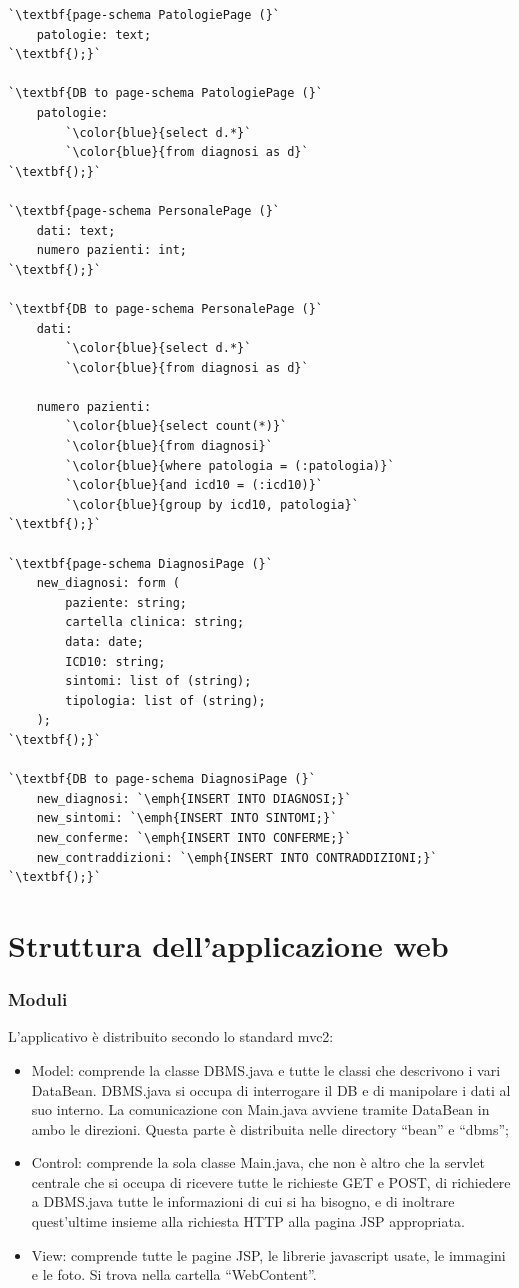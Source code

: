 \documentclass[a4paper,titlepage]{article}
\begin{document}
\newpage
\begin{lstlisting}
`\textbf{page-schema PatologiePage (}`
	patologie: text;
`\textbf{);}`

`\textbf{DB to page-schema PatologiePage (}`
	patologie: 	
		`\color{blue}{select d.*}`
		`\color{blue}{from diagnosi as d}`
`\textbf{);}`

`\textbf{page-schema PersonalePage (}`
	dati: text;
	numero pazienti: int;
`\textbf{);}`

`\textbf{DB to page-schema PersonalePage (}`
	dati: 	
		`\color{blue}{select d.*}`
		`\color{blue}{from diagnosi as d}`

	numero pazienti:
		`\color{blue}{select count(*)}`
		`\color{blue}{from diagnosi}`
		`\color{blue}{where patologia = (:patologia)}` 
		`\color{blue}{and icd10 = (:icd10)}`
		`\color{blue}{group by icd10, patologia}`
`\textbf{);}`

`\textbf{page-schema DiagnosiPage (}`
	new_diagnosi: form (
		paziente: string;
		cartella clinica: string;
		data: date;
		ICD10: string;
		sintomi: list of (string);
		tipologia: list of (string);
	);
`\textbf{);}`

`\textbf{DB to page-schema DiagnosiPage (}`
	new_diagnosi: `\emph{INSERT INTO DIAGNOSI;}`	
	new_sintomi: `\emph{INSERT INTO SINTOMI;}`
	new_conferme: `\emph{INSERT INTO CONFERME;}`
	new_contraddizioni: `\emph{INSERT INTO CONTRADDIZIONI;}`	
`\textbf{);}`
\end{lstlisting}
\newpage
\part{Struttura dell'applicazione web}

\section{Moduli}
L'applicativo è distribuito secondo lo standard mvc2:

\begin{itemize}[leftmargin=0.5cm, topsep=0.25cm, itemsep=0.2cm]
\item Model: comprende la classe DBMS.java e tutte le classi che descrivono i vari DataBean. DBMS.java si occupa di interrogare il DB e di manipolare i dati al suo interno. La comunicazione con Main.java avviene tramite DataBean in ambo le direzioni. Questa parte è distribuita nelle directory ``bean'' e ``dbms'';
\item Control: comprende la sola classe Main.java, che non è altro che la servlet centrale che si occupa di ricevere tutte le richieste GET e POST, di richiedere a 
DBMS.java tutte le informazioni di cui si ha bisogno, e di inoltrare quest'ultime insieme alla richiesta HTTP alla pagina JSP appropriata.
\item View: comprende tutte le pagine JSP, le librerie javascript usate, le immagini e le foto. Si trova nella cartella ``WebContent''.

\end{itemize}
\end{document}
